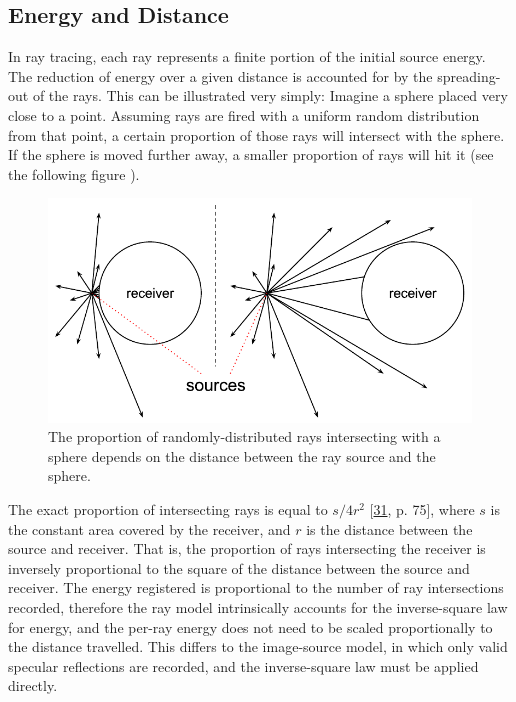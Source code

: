 \documentclass[]{scrreprt}
\begin{document}
\subsection{Energy and Distance}\label{energy-and-distance}

In ray tracing, each ray represents a finite portion of the initial
source energy. The reduction of energy over a given distance is
accounted for by the spreading-out of the rays. This can be illustrated
very simply: Imagine a sphere placed very close to a point. Assuming
rays are fired with a uniform random distribution from that point, a
certain proportion of those rays will intersect with the sphere. If the
sphere is moved further away, a smaller proportion of rays will hit it
(see the following figure \text{(\ref{fig:receiver_proximity})}).

\begin{figure}[htbp]
\centering
\includegraphics{images/receiver_proximity.pdf}
\caption{The proportion of randomly-distributed rays intersecting with a
sphere depends on the distance between the ray source and the
sphere.\label{fig:receiver_proximity}}
\end{figure}

The exact proportion of intersecting rays is equal to \(s/4r^2\)
{[}\protect\hyperlink{ref-schroderux5fphysicallyux5f2011}{31}, p. 75{]},
where \(s\) is the constant area covered by the receiver, and \(r\) is
the distance between the source and receiver. That is, the proportion of
rays intersecting the receiver is inversely proportional to the square
of the distance between the source and receiver. The energy registered
is proportional to the number of ray intersections recorded, therefore
the ray model intrinsically accounts for the inverse-square law for
energy, and the per-ray energy does not need to be scaled proportionally
to the distance travelled. This differs to the image-source model, in
which only valid specular reflections are recorded, and the
inverse-square law must be applied directly.
\end{document}
